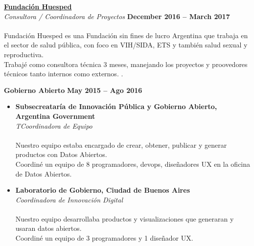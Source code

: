 \documentclass[margin,line]{resume}
\begin{document}
\begin{resume}
\begin{itemize}
\end{itemize}

\vspace{-5mm}
\textbf{\href{https://www.huesped.org.ar/}{Fundaci\'on Huesped}}\\\vspace{1mm}
\textsl{Consultora / Coordinadora de Proyectos} \hfill \textbf{December 2016 -- March 2017}\vspace{-3mm}\\\vspace{-1mm}
\\
Fundaci\'on Huesped es una Fundación sin fines de lucro Argentina que trabaja en el sector de salud pública, con foco en VIH/SIDA, ETS y tambi\'en salud sexual y reproductiva.
\\
Trabajé como consultora técnica 3 meses, manejando los proyectos y proovedores técnicos tanto internos como externos.
.


\textbf{Gobierno Abierto}\vspace{2mm}\vspace{1mm} \hfill \textbf{May 2015 -- Ago 2016}\vspace{-3mm}\\\vspace{-1mm}
\begin{itemize}
\item \textbf{Subsecreatar\'ia de Innovaci\'on P\'ublica y Gobierno Abierto, Argentina Government}\vspace{2mm}\\\vspace{1mm}
\textsl{TCoordinadora de Equipo} \hfill \vspace{-3mm}\\\vspace{-1mm}
\\
Nuestro equipo estaba encargado de crear, obtener, publicar y generar productos con Datos Abiertos.
\\
Coordiné un equipo de 8 programadores, devops, dise\~nadores UX en la oficina de Datos Abiertos.



\item \textbf{Laboratorio de Gobierno, Ciudad de Buenos Aires }\vspace{2mm}\\\vspace{1mm}
\textsl{Coordinadora de Innovación Digital} \hfill \vspace{-3mm}\\\vspace{-1mm}
\\
Nuestro equipo desarrollaba productos y visualizaciones que generaran y usaran datos abiertos.
\\
Coordiné un equipo de 3 programadores y 1 dise\~nador UX.


\end{itemize}
\end{resume}
\end{document}
